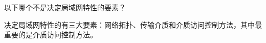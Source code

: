 \question 以下哪个不是决定局域网特性的要素？
\par{}
\begin{solution}决定局域网特性的有三大要素：网络拓扑、传输介质和介质访问控制方法，其中最重要的是介质访问控制方法。
\end{solution}
